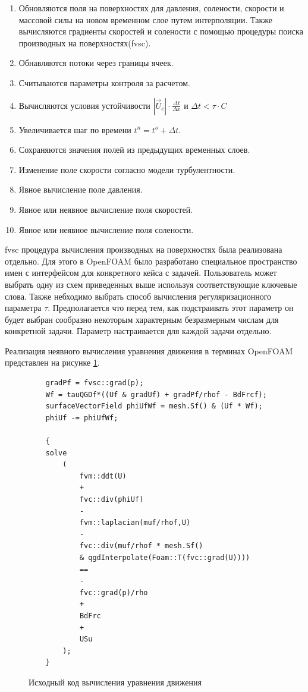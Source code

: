\begin{enumerate}[1)]
  \item Обновляются поля на поверхностях для давления, солености, скорости и массовой силы на новом временном слое путем интерполяции. Также вычисляются градиенты скоростей и солености с помощью процедуры поиска производных на поверхностях(fvsc).
  \item Обнавляются потоки через границы ячеек.
  \item Считываются параметры контроля за расчетом.
  \item Вычисляются условия устойчивости $|\vec{U}_c|\cdot \frac{\Delta t}{\Delta x}$ и $\Delta t < \tau \cdot C$
  \item Увеличивается шаг по времени $t^n = t^o + \Delta t$.
  \item Сохраняются значения полей из предыдущих временных слоев.
  \item Изменение поле скорости согласно модели турбулентности. 
  \item Явное вычисление поле давления.
  \item Явное или неявное вычисление поля скоростей.
  \item Явное или неявное вычисление поля солености.
\end{enumerate}

fvsc процедура вычисления производных на поверхностях была реализована отдельно. Для этого в OpenFOAM было разработано специальное пространство имен с интерфейсом для конкретного кейса с задачей. Пользователь может выбрать одну из схем приведенных выше используя соответствующие ключевые слова. Также небходимо выбрать способ вычисления регуляризационного параметра $\tau$. Предполагается что перед тем, как подстраивать этот параметр он будет выбран сообразно некоторым характерным безразмерным числам для конкретной задачи. Параметр настраивается для каждой задачи отдельно.

Реализация неявного вычисления уравнения движения в терминах OpenFOAM представлен на рисунке \ref{fig:velList}.

\lstset{style=mystyle}

\begin{figure}[!ht]
\centering
\begin{lstlisting}
    gradPf = fvsc::grad(p);
    Wf = tauQGDf*((Uf & gradUf) + gradPf/rhof - BdFrcf);
    surfaceVectorField phiUfWf = mesh.Sf() & (Uf * Wf);
    phiUf -= phiUfWf;

    {
    solve
        (
            fvm::ddt(U)
            +
            fvc::div(phiUf)
            -
            fvm::laplacian(muf/rhof,U)
            -
            fvc::div(muf/rhof * mesh.Sf() 
            & qgdInterpolate(Foam::T(fvc::grad(U))))
            ==
            -
            fvc::grad(p)/rho
            +
            BdFrc
            +
            USu
        );
    }
\end{lstlisting}
\caption{Исходный код вычисления уравнения движения}
\label{fig:velList}
\end{figure}

